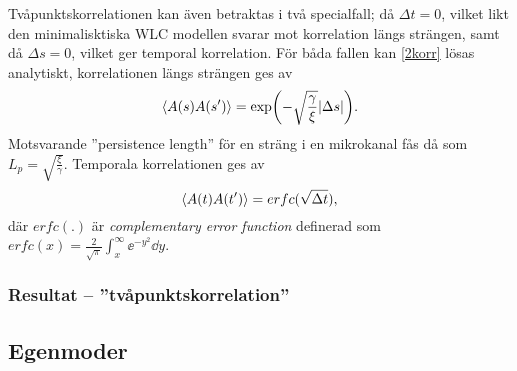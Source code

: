 Tvåpunktskorrelationen kan även betraktas i två specialfall; då $\Delta t=0$, vilket likt den minimalisktiska WLC modellen svarar mot korrelation längs strängen, samt då $\Delta s=0$, vilket ger temporal korrelation. För båda fallen kan \eqref{2korr} lösas analytiskt, korrelationen längs strängen ges av
\begin{equation}
\ev{A(s)A(s')}=\exp(-\sqrt{\frac{\gamma}{\xi}}\abs{\Delta s}).
\end{equation}
Motsvarande ''persistence length'' för en sträng i en mikrokanal fås då som $L_{p}=\sqrt{\frac{\xi}{\gamma}}$.
Temporala korrelationen ges av
\begin{equation}
    \ev{A(t)A(t')}=erfc(\sqrt{\Delta t}),
\end{equation}
där $erfc(.)$ är \emph{complementary error function} definerad som $erfc(x)=\frac{2}{\sqrt{\pi}}\int_{x}^{\infty}\ee^{-y^2}\dd y$.


\subsubsection{Resultat -- ''tvåpunktskorrelation''}



\subsection{Egenmoder}

